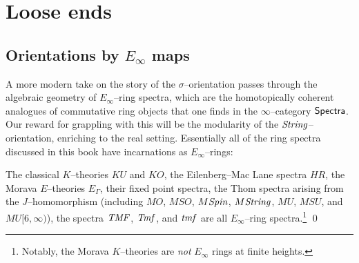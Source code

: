 
\chapter{Loose ends}








\section{Orientations by \texorpdfstring{$E_\infty$}{Eoo} maps}

A more modern take on the story of the $\sigma$--orientation passes through the algebraic geometry of $E_\infty$--ring spectra, which are the homotopically coherent analogues of commutative ring objects that one finds in the $\infty$--category $\mathsf{Spectra}$.  Our reward for grappling with this will be the modularity of the $\mathit{String}$--orientation, enriching  to the real setting.  Essentially all of the ring spectra discussed in this book have incarnations as $E_\infty$--rings:
\begin{theorem}
The classical $K$--theories $KU$ and $KO$, the Eilenberg--Mac Lane spectra $HR$, the Morava $E$--theories $E_\Gamma$, their fixed point spectra, the Thom spectra arising from the $J$--homomorphism (including $MO$, $MSO$, $M\mathit{Spin}$, $M\mathit{String}$, $MU$, $MSU$, and $MU[6, \infty)$), the spectra $\mathit{TMF}$, $\mathit{Tmf}$, and $\mathit{tmf}$ are all $E_\infty$--ring spectra.\footnote{Notably, the Morava $K$--theories are \emph{not} $E_\infty$ rings at finite heights.} \qed
\end{theorem}

